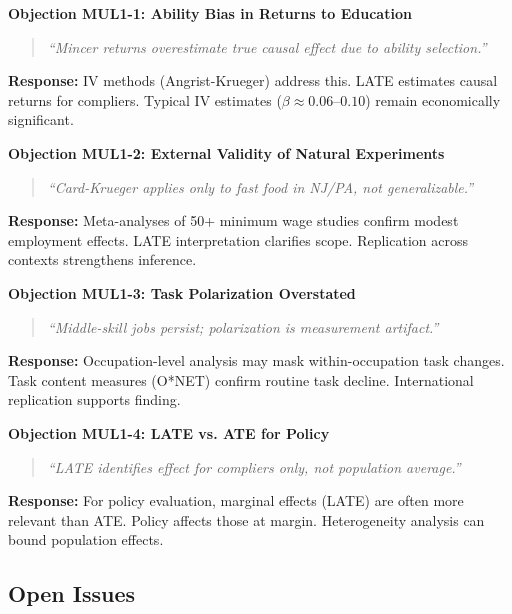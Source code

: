\begin{tcolorbox}[colback=red!5!white, colframe=red!75!black, title=\textbf{4 Critical Objections and Responses}]

\textbf{Objection MUL1-1: Ability Bias in Returns to Education}
\begin{quote}
\textit{``Mincer returns overestimate true causal effect due to ability selection.''}
\end{quote}
\textbf{Response:} IV methods (Angrist-Krueger) address this. LATE estimates causal returns for compliers. Typical IV estimates ($\beta \approx 0.06$--$0.10$) remain economically significant.

\textbf{Objection MUL1-2: External Validity of Natural Experiments}
\begin{quote}
\textit{``Card-Krueger applies only to fast food in NJ/PA, not generalizable.''}
\end{quote}
\textbf{Response:} Meta-analyses of 50+ minimum wage studies confirm modest employment effects. LATE interpretation clarifies scope. Replication across contexts strengthens inference.

\textbf{Objection MUL1-3: Task Polarization Overstated}
\begin{quote}
\textit{``Middle-skill jobs persist; polarization is measurement artifact.''}
\end{quote}
\textbf{Response:} Occupation-level analysis may mask within-occupation task changes. Task content measures (O*NET) confirm routine task decline. International replication supports finding.

\textbf{Objection MUL1-4: LATE vs. ATE for Policy}
\begin{quote}
\textit{``LATE identifies effect for compliers only, not population average.''}
\end{quote}
\textbf{Response:} For policy evaluation, marginal effects (LATE) are often more relevant than ATE. Policy affects those at margin. Heterogeneity analysis can bound population effects.
\end{tcolorbox}

\subsection{Open Issues}
\label{sec:aa-open-issues}

